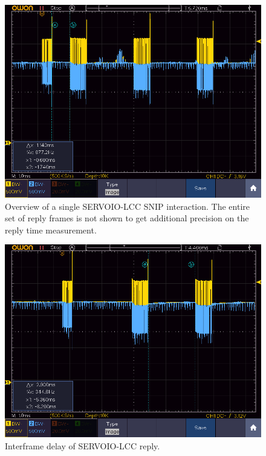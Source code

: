 \documentclass[11pt]{article}
\begin{document}
\begin{figure}[!htbp]
\centering
\includegraphics[width=1.0\linewidth]{1SNIP_SPROG_Start_delay_1_140}
\caption{Overview of a single SERVOIO-LCC SNIP interaction.
The entire set of reply frames is not shown to get additional
precision on the reply time measurement.}
\label{fig:single_SERVOIO_SNIP_interaction}
\end{figure}

\begin{figure}[!htbp]
\centering
\includegraphics[width=1.0\linewidth]{1SNIP_SPROG_Interframe_2_900}
\caption{Interframe delay of SERVOIO-LCC reply.}
\label{fig:single_SERVOIO_SNIP_interframe}
\end{figure}
\end{document}
